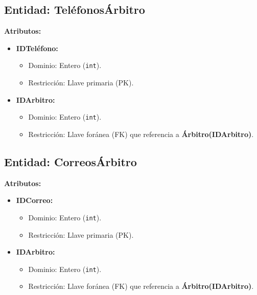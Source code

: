 \subsection*{Entidad: TeléfonosÁrbitro}
\textbf{Atributos:}
\begin{itemize}
    \item \textbf{IDTeléfono:}
    \begin{itemize}
        \item Dominio: Entero (\texttt{int}).
        \item Restricción: Llave primaria (PK).
    \end{itemize}
    \item \textbf{IDArbitro:}
    \begin{itemize}
        \item Dominio: Entero (\texttt{int}).
        \item Restricción: Llave foránea (FK) que referencia a \textbf{Árbitro(IDArbitro)}.
    \end{itemize}
\end{itemize}

\subsection*{Entidad: CorreosÁrbitro}
\textbf{Atributos:}
\begin{itemize}
    \item \textbf{IDCorreo:}
    \begin{itemize}
        \item Dominio: Entero (\texttt{int}).
        \item Restricción: Llave primaria (PK).
    \end{itemize}
    \item \textbf{IDArbitro:}
    \begin{itemize}
        \item Dominio: Entero (\texttt{int}).
        \item Restricción: Llave foránea (FK) que referencia a \textbf{Árbitro(IDArbitro)}.
    \end{itemize}
\end{itemize}

